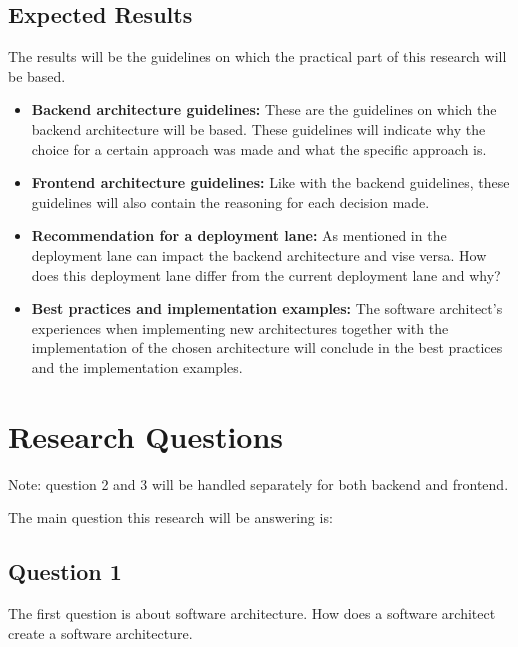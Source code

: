 \subsection{Expected Results}
\label{sec:ExpectedResults}

The results will be the guidelines on which the practical part of this research will be based.

\begin{itemize}
	\item \textbf{Backend architecture guidelines: } These are the guidelines on which the backend architecture will be based. These guidelines will indicate why the choice for a certain approach was made and what the specific approach is.

	\item \textbf{Frontend architecture guidelines: } Like with the backend guidelines, these guidelines will also contain the reasoning for each decision made.

	\item \textbf{Recommendation for a deployment lane: } As mentioned in  the deployment lane can impact the backend architecture and vise versa. How does this deployment lane differ from the current deployment lane and why?

	\item \textbf{Best practices and implementation examples: } The software architect's experiences when implementing new architectures together with the implementation of the chosen architecture will conclude in the best practices and the implementation examples.
\end{itemize}

\section{Research Questions}
Note: question 2 and 3 will be handled separately for both backend and frontend.

The main question this research will be answering is:


\subsection{Question 1}
\label{sec:Question1}
The first question is about software architecture. How does a software architect create a software architecture.

